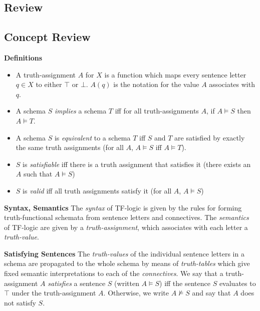 \subsection{Review}
\begin{mdframed}[linewidth=1]
\section*{Concept Review}
\textbf{Definitions}
\begin{itemize}
    \item A truth-assignment $A$ for $X$ is a function which maps every sentence letter $q \in X$ to either $\top$ or $\bot$. $A(q)$ is the notation for the value $A$ associates with $q$.

    \item A schema $S$ \emph{implies} a schema $T$ iff for all truth-assignments $A$, if $A \models S$ then $A \models T$.
    
    \item A schema $S$ is \emph{equivalent} to a schema $T$ iff $S$ and $T$ are satisfied by exactly the same truth assignments (for all $A$, $A \models S$ iff $A \models T$). 
    
    \item $S$ is \emph{satisfiable} iff there is a truth assignment that satisfies it (there exists an $A$ such that $A \models S$)
    
    \item $S$ is \emph{valid} iff all truth assignments satisfy it (for all $A$, $A \models S$)
\end{itemize}

\textbf{Syntax, Semantics}
The \emph{syntax} of TF-logic is given by the rules for forming truth-functional schemata from sentence letters and connectives. The \emph{semantics} of TF-logic are given by a \emph{truth-assignment}, which associates with each letter a \emph{truth-value}.

\textbf{Satisfying Sentences}
The \emph{truth-values} of the individual sentence letters in a schema are propagated to the whole schema by means of \emph{truth-tables} which give fixed semantic interpretations to each of the \emph{connectives}. We say that a truth-assignment $A$ \emph{satisfies} a sentence $S$ (written $A \models S$) iff the sentence $S$ evaluates to $\top$ under the truth-assignment $A$. Otherwise, we write $A \not \models S$ and say that $A$ does not satisfy $S$. 
 
\end{mdframed}


